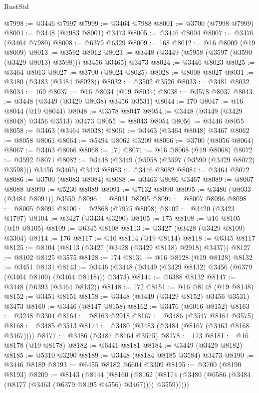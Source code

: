 \begin{lexlean}{RustStd}
\begin{coremodule}
{{{{{{{{{{{{{{{{{{{@7998 := @3446 @7997
@7999 := @3464 @7988
@8001 := @3700 (@7998 @7999)
@8004 := @3448 (@7983 @8001) @3473
@8005 := @3446 @8004
@8007 := @3476 (@3464 @7980)
@8008 := @6379 @6329
@8009 := 168
@8012 := @16 @8009 (@19 @8009)
@8013 := @3592 @8012
@8023 := @3448 (@3449 (@5958 (@3597 (@3590 (@3429 @8013) @3598))) @3456 @3465) @3473
@8024 := @3446 @8023
@8025 := @3464 @8013
@8027 := @3700 (@8024 @8025)
@8028 := @8008 @8027
@8031 := @3480 (@3483 (@3484 @8028))
@8032 := @3502 @3526
@8033 := @3481 @8032
@8034 := 169
@8037 := @16 @8034 (@19 @8034)
@8038 := @3578 @8037
@8043 := @3448 (@3449 (@3429 @8038) @3456 @3531)
@8044 := 170
@8047 := @16 @8044 (@19 @8044)
@8048 := @3578 @8047
@8054 := @3448 (@3449 (@3429 @8048) @3456 @3513) @3473
@8055 := @8043 @8054
@8056 := @3446 @8055
@8058 := @3463 (@3464 @8038)
@8061 := @3463 (@3464 @8048) @3467
@8062 := @8058 @8061
@8064 := @5494 @8062 @3209
@8066 := @3700 (@8056 @8064)
@8067 := @3463 @8066
@8068 := 171
@8071 := @16 @8068 (@19 @8068)
@8072 := @3592 @8071
@8082 := @3448 (@3449 (@5958 (@3597 (@3590 (@3429 @8072) @3598))) @3456 @3465) @3473
@8083 := @3446 @8082
@8084 := @3464 @8072
@8086 := @3700 (@8083 @8084)
@8088 := @3463 @8086 @3467
@8089 := @8067 @8088
@8090 := @5230 @8089
@8091 := @7132 @8090
@8095 := @3480 (@8033 (@3484 @8091)) @3559
@8096 := @8031 @8095
@8097 := @8007 @8096
@8098 := @8005 @8097
@8100 := @2868 (@7975 @8098)
@8102 := @3420 (@3423 @1797)
@8104 := @3427 (@3434 @3290)
@8105 := 175
@8108 := @16 @8105 (@19 @8105)
@8109 := @6345 @8108
@8113 := @3427 (@3428 (@3429 @8109) @3304)
@8114 := 176
@8117 := @16 @8114 (@19 @8114)
@8118 := @6345 @8117
@8125 := @8104 (@8113 (@3427 (@3428 (@3429 @8118) @2918) @3437))
@8127 := @8102 @8125 @3575
@8128 := 174
@8131 := @16 @8128 (@19 @8128)
@8132 := @3451 @8131
@8143 := @3446 (@3448 (@3449 (@3429 @8132) @3456 (@6379 (@3464 @8109) (@3464 @8118))) @3473)
@8144 := @6388 @8132
@8147 := @3448 (@6393 (@3464 @8132))
@8148 := 172
@8151 := @16 @8148 (@19 @8148)
@8152 := @3451 @8151
@8158 := @3448 (@3449 (@3429 @8152) @3456 @3531) @3473
@8160 := @3446 (@8147 @8158)
@8162 := @3476 (@6016 @8152)
@8163 := @3248 @3304
@8164 := @8163 @2918
@8167 := @3486 (@3547 @8164 @3575)
@8168 := @3485 @3513
@8174 := @3480 (@3483 (@3484 (@8167 (@3463 @8168 @3467))))
@8177 := @3486 (@3487 @8164 @3575)
@8178 := 173
@8181 := @16 @8178 (@19 @8178)
@8182 := @6441 @8181
@8184 := @3449 (@3429 @8182)
@8185 := @5310 @3290
@8189 := @3448 (@8184 @8185 @3584) @3473
@8190 := @3446 @8189
@8193 := @6455 @8182 @6604 @3309
@8195 := @3700 (@8190 @8193)
@8209 := @8143
    (@8144
      (@8160
        (@8162 (@8174 (@3480 (@6586 (@3484 (@8177 (@3463 (@6379 @8195 @4556) @3467)))) @3559)))))
}}}}}}}}}}}}}}}}}}}
\end{coremodule}
\end{lexlean}
